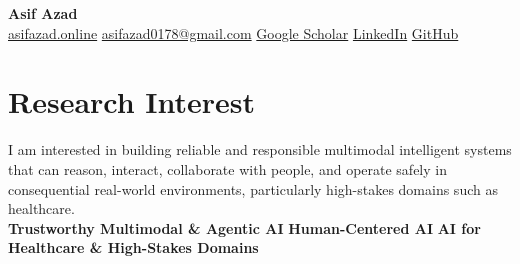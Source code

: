 \documentclass[10pt,letterpaper]{article}
\makeatletter
\newenvironment{entry}
    {\begin{minipage}{\linewidth}\color{textColor}}
    {\end{minipage}}
\newcommand{\daterow}[3]{%
    \begin{tabularx}{\linewidth}{@{}X>{\raggedleft\arraybackslash}p{3.8cm}@{}}
        #1 & \textcolor{mutedColor}{#2}\\
        #3 &
    \end{tabularx}
}
\makeatother
\begin{document}
\begin{center}
    {\fontsize{22pt}{25pt}\selectfont\bfseries\color{primaryColor} Asif Azad}\\[0.32em]
    \href{https://asifazad.online/}{asifazad.online}
    \enspace\textcolor{mutedColor}{\textbar}\enspace
    \href{mailto:asifazad0178@gmail.com}{asifazad0178@gmail.com}
    \enspace\textcolor{mutedColor}{\textbar}\enspace
    \href{https://scholar.google.com/citations?user=nDhZSTQAAAAJ}{Google Scholar}
    \enspace\textcolor{mutedColor}{\textbar}\enspace
    \href{https://www.linkedin.com/in/asifazad2677}{LinkedIn}
    \enspace\textcolor{mutedColor}{\textbar}\enspace
    \href{https://github.com/BRAINIAC2677}{GitHub}
\end{center}
\vspace{-0.35em}

\section{Research Interest}
\begin{entry}
I am interested in building reliable and responsible multimodal intelligent systems that can reason, interact, collaborate with people, and operate safely in consequential real-world environments, particularly high-stakes domains such as healthcare.\\[0.38em]
\textbf{Trustworthy Multimodal \& Agentic AI}
\enspace\textcolor{primaryColor}{\textbullet}\enspace
\textbf{Human-Centered AI}
\enspace\textcolor{primaryColor}{\textbullet}\enspace
\textbf{AI for Healthcare \& High-Stakes Domains}
\end{entry}

\newcommand{\educationsection}{%
\section{Education}
\begin{entry}
\daterow
    {\textbf{Bangladesh University of Engineering and Technology (BUET)}}
    {Feb 2020 -- Mar 2025}
    {B.Sc. in Computer Science and Engineering}
\vspace{0.16em}
\textbf{CGPA:} 3.91/4.00
\enspace\textcolor{mutedColor}{\textbar}\enspace
\textbf{Top 10\%}
\enspace\textcolor{mutedColor}{\textbar}\enspace
\textbf{Dean's List:} three consecutive years\\[0.28em]
\textbf{Undergraduate thesis:}
\href{https://link.springer.com/chapter/10.1007/978-3-032-00652-3_3}{\textit{Beyond Accuracy: Enhancing Parkinson's Diagnosis with Uncertainty Quantification of Machine Learning Models}}\\[0.28em]
\textbf{Supervisor:} \href{https://cse.buet.ac.bd/faculty/faculty_detail/mrahman}{Prof. M Saifur Rahman}
\enspace\textcolor{mutedColor}{\textbar}\enspace
\textbf{Best Paper Award nominee}, AI in Healthcare Conference (AIiH) 2025
\end{entry}
}
\end{document}
